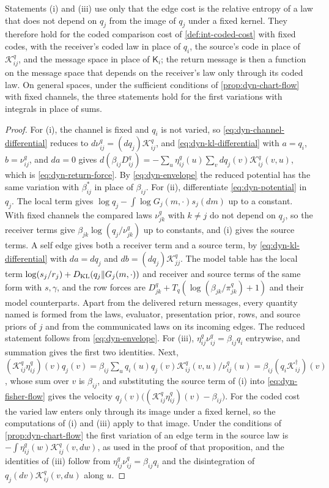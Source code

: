 Statements (i) and (iii) use only that the edge cost is the relative entropy of a law that does not depend on $q_j$ from the image of $q_j$ under a fixed kernel. They therefore hold for the coded comparison cost of \cref{def:int-coded-cost} with fixed codes, with the receiver's coded law in place of $q_i$, the source's code in place of $\mathcal K^q_{ij}$, and the message space in place of $\mathsf K_i$; the return message is then a function on the message space that depends on the receiver's law only through its coded law. On general spaces, under the sufficient conditions of \cref{prop:dyn-chart-flow} with fixed channels, the three statements hold for the first variations with integrals in place of sums.
\begin{proof}
For (i), the channel is fixed and $q_i$ is not varied, so \cref{eq:dyn-channel-differential} reduces to $d\nu^q_{ij}=(dq_j)\mathcal K^q_{ij}$, and \cref{eq:dyn-kl-differential} with $a=q_i$, $b=\nu^q_{ij}$, and $da=0$ gives $d(\beta_{ij}D^q_{ij})=-\sum_u\eta^q_{ij}(u)\sum_vdq_j(v)\mathcal K^q_{ij}(v,u)$, which is \cref{eq:dyn-return-force}. By \cref{eq:dyn-envelope} the reduced potential has the same variation with $\beta^*_{ij}$ in place of $\beta_{ij}$. For (ii), differentiate \cref{eq:dyn-potential} in $q_j$. The local term gives $\log q_j-\int\log G_j(m,\cdot)s_j(dm)$ up to a constant. With fixed channels the compared laws $\nu^q_{jk}$ with $k\neq j$ do not depend on $q_j$, so the receiver terms give $\beta_{jk}\log(q_j/\nu^q_{jk})$ up to constants, and (i) gives the source terms. A self edge gives both a receiver term and a source term, by \cref{eq:dyn-kl-differential} with $da=dq_j$ and $db=(dq_j)\mathcal K^q_{jj}$. The model table has the local term $\log(s_j/r_j)+D_{\mathrm{KL}}(q_j\Vert G_j(m,\cdot))$ and receiver and source terms of the same form with $s,\gamma$, and the row forces are $D^q_{jk}+T_q(\log(\beta_{jk}/\pi^q_{jk})+1)$ and their model counterparts. Apart from the delivered return messages, every quantity named is formed from the laws, evaluator, presentation prior, rows, and source priors of $j$ and from the communicated laws on its incoming edges. The reduced statement follows from \cref{eq:dyn-envelope}. For (iii), $\eta^q_{ij}\nu^q_{ij}=\beta_{ij}q_i$ entrywise, and summation gives the first two identities. Next, $(\mathcal K^q_{ij}\eta^q_{ij})(v)q_j(v)=\beta_{ij}\sum_uq_i(u)q_j(v)\mathcal K^q_{ij}(v,u)/\nu^q_{ij}(u)=\beta_{ij}(q_i\mathcal K^\dagger_{ij})(v)$, whose sum over $v$ is $\beta_{ij}$, and substituting the source term of (i) into \cref{eq:dyn-fisher-flow} gives the velocity $q_j(v)\bigl((\mathcal K^q_{ij}\eta^q_{ij})(v)-\beta_{ij}\bigr)$. For the coded cost the varied law enters only through its image under a fixed kernel, so the computations of (i) and (iii) apply to that image. Under the conditions of \cref{prop:dyn-chart-flow} the first variation of an edge term in the source law is $-\int\eta^q_{ij}(w)\mathcal K^q_{ij}(v,dw)$, as used in the proof of that proposition, and the identities of (iii) follow from $\eta^q_{ij}\nu^q_{ij}=\beta_{ij}q_i$ and the disintegration of $q_j(dv)\mathcal K^q_{ij}(v,du)$ along $u$.
\end{proof}

